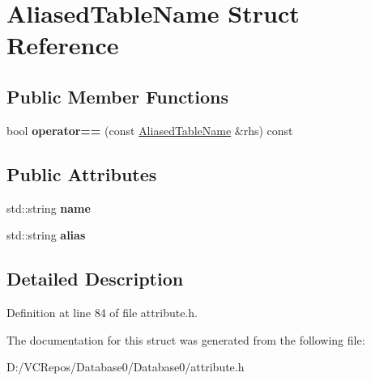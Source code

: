 \hypertarget{struct_aliased_table_name}{}\section{Aliased\+Table\+Name Struct Reference}
\label{struct_aliased_table_name}
\subsection*{Public Member Functions}
\begin{DoxyCompactItemize}
\item 
\mbox{\label{struct_aliased_table_name_ad994b303faefb9b1860c4e3ed1562563}} 
bool {\bfseries operator==} (const \mbox{\hyperlink{struct_aliased_table_name}{Aliased\+Table\+Name}} \&rhs) const
\end{DoxyCompactItemize}
\subsection*{Public Attributes}
\begin{DoxyCompactItemize}
\item 
\mbox{\label{struct_aliased_table_name_a07363d5590fc974b1da756d5cee129e3}} 
std\+::string {\bfseries name}
\item 
\mbox{\label{struct_aliased_table_name_ac185957e21fd36f09829581ce0037818}} 
std\+::string {\bfseries alias}
\end{DoxyCompactItemize}


\subsection{Detailed Description}


Definition at line 84 of file attribute.\+h.



The documentation for this struct was generated from the following file\+:\begin{DoxyCompactItemize}
\item 
D\+:/\+V\+C\+Repos/\+Database0/\+Database0/attribute.\+h\end{DoxyCompactItemize}
